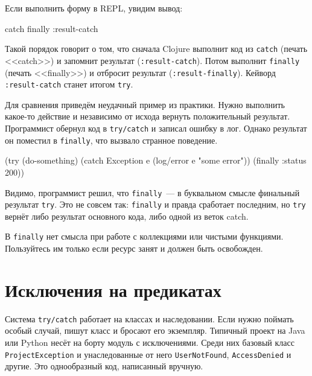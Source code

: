 Если выполнить форму в REPL, увидим вывод:

\begin{english}
  \begin{clojure}
catch
finally
:result-catch
  \end{clojure}
\end{english}

Такой порядок говорит о том, что сначала Clojure выполнит код из \verb|catch|
(печать <<catch>>) и запомнит результат (\verb|:result-catch|). Потом выполнит
\verb|finally| (печать <<finally>>) и отбросит результат
(\verb|:result-finally|). Кейворд \verb|:result-catch| станет итогом \verb|try|.

Для сравнения приведём неудачный пример из практики. Нужно выполнить какое-то
действие и независимо от исхода вернуть положительный результат. Программист
обернул код в \verb|try/catch| и записал ошибку в лог. Однако результат он
поместил в \verb|finally|, что вызвало странное поведение.

\begin{english}
  \begin{clojure}
(try
  (do-something)
  (catch Exception e
    (log/error e "some error"))
  (finally
    {:status 200}))
  \end{clojure}
\end{english}

Видимо, программист решил, что \verb|finally|~--- в буквальном смысле финальный
результат \verb|try|. Это не совсем так: \verb|finally| и правда сработает
последним, но \verb|try| вернёт либо результат основного кода, либо одной из
веток catch.

В \verb|finally| нет смысла при работе с коллекциями или чистыми
функциями. Пользуйтесь им только если ресурс занят и должен быть освобожден.

\section{Исключения на предикатах}


Система \verb|try/catch| работает на классах и наследовании. Если нужно
поймать особый случай, пишут класс и бросают его экземпляр. Типичный проект на
Java или Python несёт на борту модуль с исключениями. Среди них базовый класс
\verb|ProjectException| и унаследованные от него \verb|UserNotFound|,
\verb|AccessDenied| и другие. Это однообразный код, написанный вручную.

